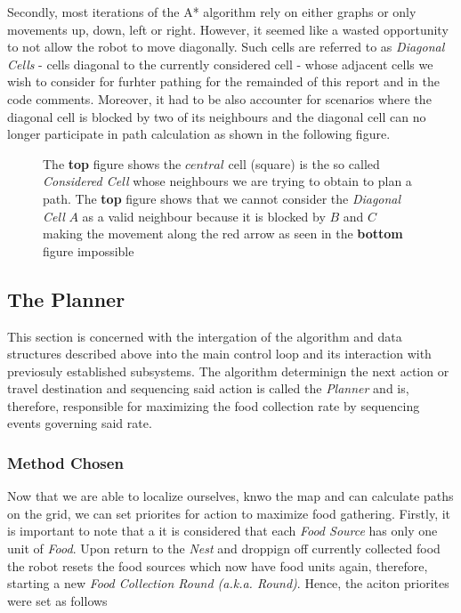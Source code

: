 \documentclass[11pt, a4paper]{article}
\begin{document}
Secondly, most iterations of the A* algorithm rely on either graphs\cite{path_astar_grid_no_grid}  or only movements up, down, left or right\cite{path_astar_grid_no_diagonals}. However, it seemed like a wasted opportunity to not allow the robot to move diagonally. Such cells are referred to as  \textit{Diagonal Cells} - cells diagonal to the currently considered cell - whose adjacent cells we wish to consider for furhter pathing for the remainded of this report and in the code comments. Moreover, it had to be also accounter for scenarios where the diagonal cell is blocked by two of its neighbours and the diagonal cell can no longer participate in path calculation as shown in the following figure.


\begin{figure}[H]
	  \caption{The \textbf{top} figure shows the $central$ cell (square) is the so called \textit{Considered Cell} whose neighbours we are trying to obtain to plan a path. The \textbf{top} figure shows that we cannot consider the \textit{Diagonal Cell} $A$ as a valid neighbour because it is blocked by $B$ and $C$ making the movement along the red arrow as seen in the \textbf{bottom} figure impossible}
\end{figure} 









\subsection{The Planner}

This section is concerned with the intergation of the algorithm and data structures described above into the main control loop and its interaction with previosuly established subsystems\cite{task2_report}. The algorithm determinign the next action or travel destination and sequencing said action is called the \textit{Planner} and is, therefore, responsible for maximizing the food collection rate by sequencing events governing said rate.

\subsubsection{Method Chosen}
\label{Planner Principle}

Now that we are able to localize ourselves, knwo the map and can calculate paths on the grid, we can set priorites for action to maximize food gathering. Firstly, it is important to note that a it is considered that each \textit{Food Source} has only one unit of \textit{Food}. Upon return to the \textit{Nest} and droppign off currently collected food the robot resets the food sources which now have food units again, therefore, starting a new \textit{Food Collection Round (a.k.a. Round)}. Hence, the aciton priorites were set as follows
\end{document}
